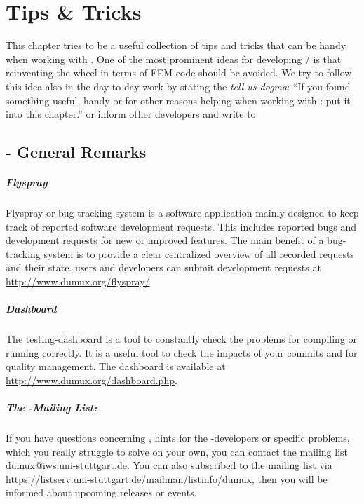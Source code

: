 \chapter{Tips \& Tricks}

This chapter tries to be a useful collection of tips and tricks that can be handy
when working with \Dumux. One of the most prominent ideas for developing
\Dune / \Dumux is that reinventing the wheel in terms of FEM code should
be avoided. We try to follow this idea also in the day-to-day work by
stating the \emph{tell us dogma}: ``If you found something useful, 
handy or for other reasons helping when working with \Dumux: put it into
this chapter.'' or inform other developers and write to 

\section{\Dumux - General Remarks}

\paragraph{Flyspray}
Flyspray or bug-tracking system is a software application mainly designed to
keep track of reported software development requests. This includes reported
bugs and development requests for new or improved features. The main benefit
of a bug-tracking system is to provide a clear centralized overview of all
recorded requests and their state. \Dumux users and developers can submit
development requests at \url{http://www.dumux.org/flyspray/}.

\paragraph{Dashboard}
The testing-dashboard is a tool to constantly check the \Dumux problems for compiling
or running correctly. It is a useful tool to check the impacts of your commits
and for quality management. The dashboard is available at 
\url{http://www.dumux.org/dashboard.php}.

\paragraph{The \Dumux-Mailing List:}
If you have questions concerning \Dumux, hints for the \Dumux-developers
or specific problems, which you really struggle to solve on your own,
you can contact the mailing list \url{dumux@iws.uni-stuttgart.de}.
You can also subscribed to the mailing list via
\url{https://listserv.uni-stuttgart.de/mailman/listinfo/dumux}, then you
will be informed about upcoming releases or events.

